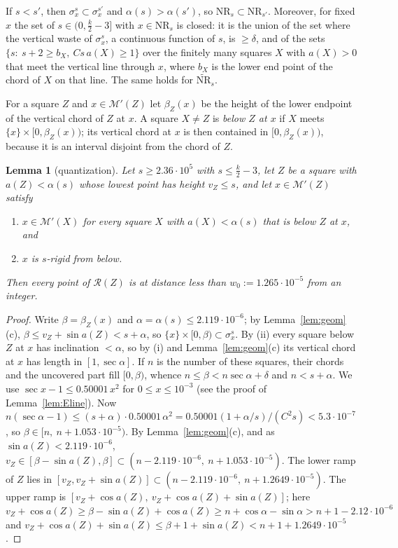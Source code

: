 \documentclass[11pt]{amsart}
\newtheorem{lemma}[theorem]{Lemma}
\theoremstyle{definition}
\theoremstyle{remark}
\begin{document}
If $s<s'$, then $\sigma^s_x\subset\sigma^{s'}_x$ and $\alpha(s)>\alpha(s')$, so $\mathrm{NR}_s\subset\mathrm{NR}_{s'}$. Moreover, for fixed $x$
the set of $s\in(0,\frac k2-3]$ with $x\in\mathrm{NR}_s$ is closed: it is the union of the set where the vertical waste of
$\sigma^s_x$, a continuous function of $s$, is $\ge\delta$, and of the sets $\{s:\ s+2\ge b_X,\ Cs\,a(X)\ge1\}$ over the finitely many
squares $X$ with $a(X)>0$ that meet the vertical line through $x$, where $b_X$ is the lower end point of the chord of $X$ on
that line. The same holds for $\widetilde{\mathrm{NR}}_s$.

For a square $Z$ and $x\in\mathcal M'(Z)$ let $\beta_Z(x)$ be the height of the lower endpoint of the vertical chord of
$Z$ at $x$. A square $X\ne Z$ is \emph{below $Z$ at $x$} if $X$ meets $\{x\}\times[0,\beta_Z(x))$; its vertical chord at
$x$ is then contained in $[0,\beta_Z(x))$, because it is an interval disjoint from the chord of $Z$.

\begin{lemma}[quantization]\label{lem:Q}
Let $s\ge2.36\cdot10^5$ with $s\le\frac k2-3$, let $Z$ be a square with $a(Z)<\alpha(s)$ whose lowest point has height
$v_Z\le s$, and let $x\in\mathcal M'(Z)$ satisfy
\begin{enumerate}[label=(\roman*)]
\item $x\in\mathcal M'(X)$ for every square $X$ with $a(X)<\alpha(s)$ that is below $Z$ at $x$, and
\item $x$ is $s$-rigid from below.
\end{enumerate}
Then every point of $\mathcal R(Z)$ is at distance less than $w_0:=1.265\cdot10^{-5}$ from an integer.
\end{lemma}

\begin{proof}
Write $\beta=\beta_Z(x)$ and $\alpha=\alpha(s)\le2.119\cdot10^{-6}$; by Lemma~\ref{lem:geom}(c), $\beta\le v_Z+\sin a(Z)<s+\alpha$,
so $\{x\}\times[0,\beta)\subset\sigma^s_x$. By (ii) every square below $Z$ at $x$ has inclination $<\alpha$, so by (i) and
Lemma~\ref{lem:geom}(c) its vertical chord at $x$ has length in $[1,\sec\alpha]$. If $n$ is the number of these squares,
their chords and the uncovered part fill $[0,\beta)$, whence $n\le\beta<n\sec\alpha+\delta$ and $n<s+\alpha$. We use
$\sec x-1\le0.50001\,x^2$ for $0\le x\le10^{-3}$ (see the proof of Lemma~\ref{lem:Eline}). Now
$n(\sec\alpha-1)\le(s+\alpha)\cdot0.50001\,\alpha^2=0.50001(1+\alpha/s)/(C^2s)<5.3\cdot10^{-7}$, so $\beta\in[n,\ n+1.053\cdot10^{-5})$. By
Lemma~\ref{lem:geom}(c), and as $\sin a(Z)<2.119\cdot10^{-6}$, $v_Z\in[\beta-\sin a(Z),\beta]\subset(n-2.119\cdot10^{-6},\ n+1.053\cdot10^{-5})$.
The lower ramp of $Z$ lies in $[v_Z,v_Z+\sin a(Z)]\subset(n-2.119\cdot10^{-6},\ n+1.2649\cdot10^{-5})$. The upper ramp is
$[v_Z+\cos a(Z),\ v_Z+\cos a(Z)+\sin a(Z)]$; here $v_Z+\cos a(Z)\ge\beta-\sin a(Z)+\cos a(Z)\ge n+\cos\alpha-\sin\alpha
>n+1-2.12\cdot10^{-6}$ and $v_Z+\cos a(Z)+\sin a(Z)\le\beta+1+\sin a(Z)<n+1+1.2649\cdot10^{-5}$.
\end{proof}
\end{document}
